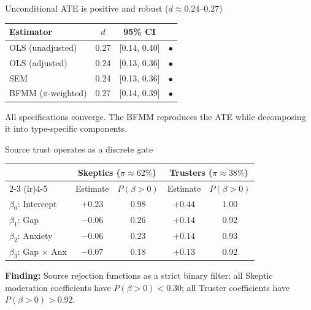 \documentclass[aspectratio=169,11pt]{beamer}
\begin{document}
\begin{frame}{Unconditional ATE is positive and robust ($d \approx 0.24$--$0.27$)}

\begin{table}
\centering
\small
\begin{tabular}{lccc}
\toprule
\textbf{Estimator} & \textbf{$d$} & \textbf{95\% CI} & \\
\midrule
OLS (unadjusted)    & 0.27 & [0.14, 0.40] & \textcolor{sbugreen}{$\bullet$} \\
OLS (adjusted)       & 0.24 & [0.13, 0.36] & \textcolor{sbugreen}{$\bullet$} \\
SEM                  & 0.24 & [0.13, 0.36] & \textcolor{sbugreen}{$\bullet$} \\
BFMM ($\pi$-weighted) & 0.27 & [0.14, 0.39] & \textcolor{sbugreen}{$\bullet$} \\
\bottomrule
\end{tabular}
\end{table}

\vspace{0.3cm}
{\small All specifications converge. The BFMM reproduces the ATE while decomposing it into type-specific components.}

\end{frame}

\begin{frame}{Source trust operates as a discrete gate}

\begin{table}
\centering
\small
\begin{tabular}{lcccc}
\toprule
 & \multicolumn{2}{c}{\textbf{Skeptics ($\pi \approx 62\%$)}} & \multicolumn{2}{c}{\textbf{Trusters ($\pi \approx 38\%$)}} \\
\cmidrule(lr){2-3} \cmidrule(lr){4-5}
 & Estimate & $P(\beta > 0)$ & Estimate & $P(\beta > 0)$ \\
\midrule
$\beta_0$: Intercept        & $+0.23$ & 0.98 & $+0.44$ & 1.00 \\
$\beta_1$: Gap               & $-0.06$ & 0.26 & $+0.14$ & 0.92 \\
$\beta_2$: Anxiety            & $-0.06$ & 0.23 & $+0.14$ & 0.93 \\
$\beta_3$: Gap $\times$ Anx   & $-0.07$ & 0.18 & $+0.13$ & 0.92 \\
\bottomrule
\end{tabular}
\end{table}

\vspace{0.3cm}
{\small \textcolor{sbuamber}{\textbf{Finding:}} Source rejection functions as a strict binary filter: all Skeptic moderation coefficients have $P(\beta > 0) < 0.30$; all Truster coefficients have $P(\beta > 0) > 0.92$.}

\end{frame}
\end{document}
